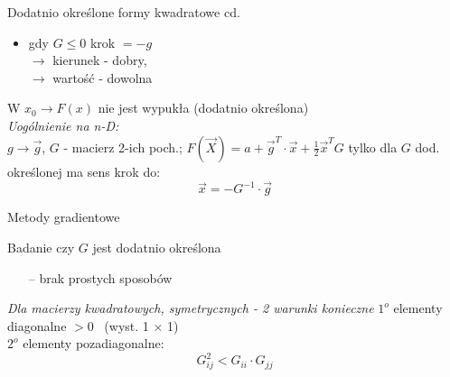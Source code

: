   \begin{frame}{Dodatnio określone formy kwadratowe cd.}

    \begin{block}{}
    	\begin{itemize}
	  	    \item gdy $G \leq 0$ krok $= -g$
	  	    \\$\rightarrow$ kierunek - dobry,
	  	    \\$\rightarrow$ wartość - dowolna
	    \end{itemize}
	    W $x_0 \rightarrow F(x)$ nie jest wypukła (dodatnio określona)
	    \medskip\\
	    \emph{Uogólnienie na n-D:}\\
	    $g \rightarrow \vec{g}$, $G$ - macierz 2-ich poch.;
	    $F(\vec X) = a + \vec{g}^T \cdot \vec{x} + \frac{1}{2} \vec{x}^T G$ tylko dla $G$ dod. określonej
	    ma sens krok do:
	    \begin{displaymath}
	  		\vec{x} = - G^{-1} \cdot \vec{g}
	    \end{displaymath}
    \end{block}

  \end{frame}

  \begin{frame}{Metody gradientowe}

    \begin{block}{Badanie czy $G$ jest dodatnio określona}
      \begin{itemize}
      		\item[--] brak prostych sposobów
      \end{itemize}
    \end{block}
    \begin{block}{\emph{Dla macierzy kwadratowych, symetrycznych - 2 warunki konieczne}}
      $1^o$ elementy diagonalne $> 0$ \ (wyst. 1 $\times$ 1)
      \\$2^o$ elementy pozadiagonalne:
      \begin{displaymath}
      		G_{ij}^2 < G_{ii} \cdot G_{jj}
      \end{displaymath}
    \end{block}

  \end{frame}

